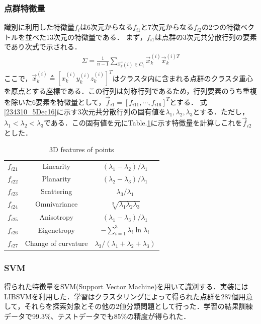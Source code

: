 \documentclass[10pt,a4paper]{jarticle}
\begin{document}
\subsubsection{点群特徴量}
識別に利用した特徴量$f_{i}$は6次元からなる$f_{i1}$と7次元からなる$f_{i2}$の2つの特徴ベクトルを並べた13次元の特徴量である．
まず，$f_{i1}$は点群の3次元共分散行列の要素であり次式で示される．
\begin{eqnarray}
 \Sigma = \frac{1}{n-1}\sum_{\vec{x_{k}}(i)\in C_{i}}\vec{x}_{k}^{(i)}\vec{x}_{k}^{(i)T}\label{234310_5Dec16}
\end{eqnarray}
ここで，$\vec{x}_{k}^{(i)}\triangleq[x_{k}^{(i)} y_{k}^{(i)} z_{k}^{(i)}]^{T}$はクラスタ内に含まれる点群のクラスタ重心を原点とする座標である．この行列は対称行列であるため，行列要素のうち重複を除いた6要素を特徴量として，$\vec{f}_{i1} = [f_{i11}, \cdots, f_{i16}]^{T}$とする．
式\eqref{234310_5Dec16}に示す3次元共分散行列の固有値を$\lambda_{1}, \lambda_{2}, \lambda_{3}$とする．ただし，$\lambda_{1} < \lambda_{2} < \lambda_{3}$である．この固有値を元にTable.\ref{222525_5Dec16}に示す特徴量を計算しこれを$\vec{f}_{i2}$とした．
\begin{table}
 \centering
 \caption{3D features of points}
 \label{222525_5Dec16}
 \begin{tabular}{|c|c|c|}
  \hline
  $f_{i21}$ & Linearity & $(\lambda_{1}-\lambda_{2})/\lambda_{1}$ \\
  $f_{i22}$ & Planarity & $(\lambda_{2}-\lambda_{3})/\lambda_{1}$ \\
  $f_{i23}$ & Scattering & $\lambda_{3}/\lambda_{1}$ \\
  $f_{i24}$ & Omnivariance & $\sqrt[3]{\lambda_{1}\lambda_{2}\lambda_{3}}$ \\
  $f_{i25}$ & Anisotropy & $(\lambda_{1}-\lambda_{3})/\lambda_{1}$ \\
  $f_{i26}$ & Eigenetropy & $-\sum^{3}_{i=1}\lambda_{i}\ln\lambda_{i}$ \\
  $f_{i27}$ & Change of curvature & $\lambda_{3}/(\lambda_{1}+\lambda_{2}+\lambda_{3})$ \\
  \hline
 \end{tabular}
\end{table}

\subsubsection{SVM}
得られた特徴量をSVM(Support Vector Machine)を用いて識別する．実装にはLIBSVMを利用した．学習はクラスタリングによって得られた点群を287個用意して，それらを探索対象とその他の2値分類問題として行った．学習の結果訓練データで99.3\%、テストデータでも85\%の精度が得られた．
\end{document}
